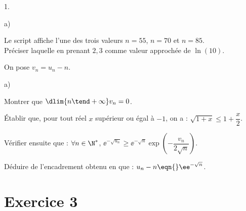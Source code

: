 \documentclass[11pt]{article}%
\begin{document}
\begin{noliste}{1.}
\begin{noliste}{a)}


    

  \item Le script affiche l'une des trois valeurs $n = 55$, $n = 70$
    et $n = 85$. \\
    Préciser laquelle en prenant $2,3$ comme valeur approchée de
    $\ln(10)$.

        
  \end{noliste}




\item On pose $v_n = u_n-n$.
  \begin{noliste}{a)}
    \setlength{\itemsep}{2mm}
  \item Montrer que $\dlim{n \tend +\infty} v_n= 0$.

    

  \item Établir que, pour tout réel $x$ supérieur ou égal à $-1$, on a
    : $\sqrt{1 + x} \leq 1 + \dfrac{x}{2}$.

    




  \item Vérifier ensuite que : $\forall n \in \N^{*}$,
    $\ee^{-\sqrt{u_n}} \geq \ee^{-\sqrt{n}} \exp\left(
      -\dfrac{v_n}{2\sqrt{n}} \right)$.

    




  \item Déduire de l'encadrement obtenu en  que : $u_n - n
    \eqn{} \ee^{-\sqrt{n}}$.

    
  \end{noliste}
\end{noliste}

\section*{Exercice 3}
\end{document}
